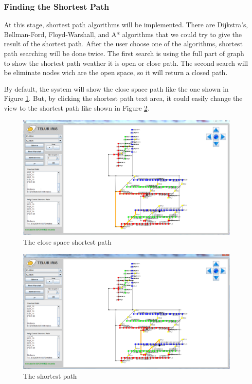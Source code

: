 \vspace{10mm}
\subsubsection{Finding the Shortest Path}
At this stage, shortest path algorithms will be implemented. There are Dijkstra's, Bellman-Ford, Floyd-Warshall, and A* algorithms that we could try to give the result of the shortest path. After the user choose one of the algorithms, shortest path searching will be done twice. The first search is using the full part of graph to show the shortest path weather it is open or close path. The second search will be eliminate nodes wich are the open space, so it will return a closed path.

By default, the system will show the close space path like the one shown in Figure \ref{fig:figure16}. But, by clicking the shortest path text area, it could easily change the view to the shortest path like shown in Figure \ref{fig:figure17}.

\begin{figure}[h!]
	\centering
	\includegraphics[scale=0.4]{figure16.PNG}
	\caption{The close space shortest path}
	\label{fig:figure16}
\end{figure}

\begin{figure}[h!]
	\centering
	\includegraphics[scale=0.4]{figure17.PNG}
	\caption{The shortest path}
	\label{fig:figure17}
\end{figure}

